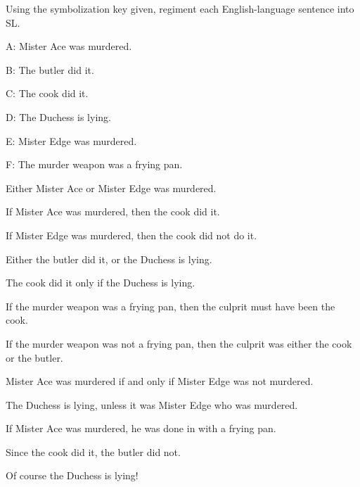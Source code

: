 \problempart Using the symbolization key given, regiment each English-language sentence into SL.
\begin{ekey}
\item[A:] Mister Ace was murdered.
\item[B:] The butler did it.
\item[C:] The cook did it.
\item[D:] The Duchess is lying.
\item[E:] Mister Edge was murdered.
\item[F:] The murder weapon was a frying pan.
\end{ekey}
\begin{earg}
\item Either Mister Ace or Mister Edge was murdered.
\item If Mister Ace was murdered, then the cook did it.
\item If Mister Edge was murdered, then the cook did not do it.
\item Either the butler did it, or the Duchess is lying.
\item The cook did it only if the Duchess is lying.
\item If the murder weapon was a frying pan, then the culprit must have been the cook.
\item If the murder weapon was not a frying pan, then the culprit was either the cook or the butler.
\item Mister Ace was murdered if and only if Mister Edge was not murdered.
\item The Duchess is lying, unless it was Mister Edge who was murdered.
\item If Mister Ace was murdered, he was done in with a frying pan.
\item Since the cook did it, the butler did not.
\item Of course the Duchess is lying!
\end{earg}



